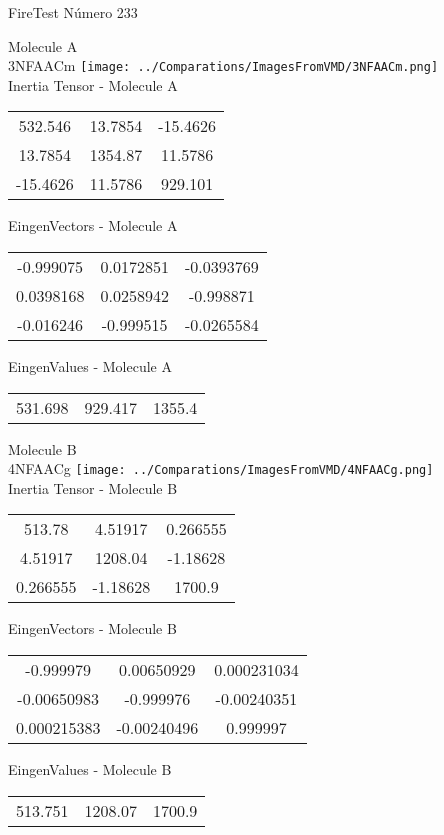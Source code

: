 \vtab[-2cm]
\begin{center}
{\large FireTest \tab Número 233}
\end{center}
\begin{multicols}{2}
\begin{center}

Molecule A \\ 
3NFAACm
\texttt{[image: ../Comparations/ImagesFromVMD/3NFAACm.png]}
\\
Inertia Tensor - Molecule A \\
\vtab

\begin{tabular}{|c c c|}
532.546	 & 	13.7854	 & 	-15.4626	 \\
13.7854	 & 	1354.87	 & 	11.5786	 \\
-15.4626	 & 	11.5786	 & 	929.101
\end{tabular}

\vtab
 EingenVectors - Molecule A     \\
\vtab
\begin{tabular}{|c c c|}
-0.999075	 & 	0.0172851	 & 	-0.0393769	 \\
0.0398168	 & 	0.0258942	 & 	-0.998871	 \\
-0.016246	 & 	-0.999515	 & 	-0.0265584
\end{tabular}

\vtab
 EingenValues - Molecule A     \\
\vtab
\begin{tabular}{|c c c|}
531.698	 & 	929.417	 & 	1355.4	 \\
\end{tabular}
\columnbreak

Molecule B \\ 
4NFAACg
\texttt{[image: ../Comparations/ImagesFromVMD/4NFAACg.png]}
\\
Inertia Tensor - Molecule B \\
\vtab

\begin{tabular}{|c c c|}
513.78	 & 	4.51917	 & 	0.266555	 \\
4.51917	 & 	1208.04	 & 	-1.18628	 \\
0.266555	 & 	-1.18628	 & 	1700.9
\end{tabular}

\vtab
 EingenVectors - Molecule B     \\
\vtab
\begin{tabular}{|c c c|}
-0.999979	 & 	0.00650929	 & 	0.000231034	 \\
-0.00650983	 & 	-0.999976	 & 	-0.00240351	 \\
0.000215383	 & 	-0.00240496	 & 	0.999997
\end{tabular}

\vtab
 EingenValues - Molecule B     \\
\vtab
\begin{tabular}{|c c c|}
513.751	 & 	1208.07	 & 	1700.9	 \\
\end{tabular}

\end{center}
\end{multicols}
